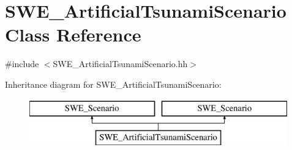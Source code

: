 \hypertarget{classSWE__ArtificialTsunamiScenario}{\section{S\-W\-E\-\_\-\-Artificial\-Tsunami\-Scenario Class Reference}
\label{classSWE__ArtificialTsunamiScenario}
}


{\ttfamily \#include $<$S\-W\-E\-\_\-\-Artificial\-Tsunami\-Scenario.\-hh$>$}

Inheritance diagram for S\-W\-E\-\_\-\-Artificial\-Tsunami\-Scenario\-:\begin{figure}[H]
\begin{center}
\leavevmode
\includegraphics[height=2.000000cm]{classSWE__ArtificialTsunamiScenario}
\end{center}
\end{figure}
